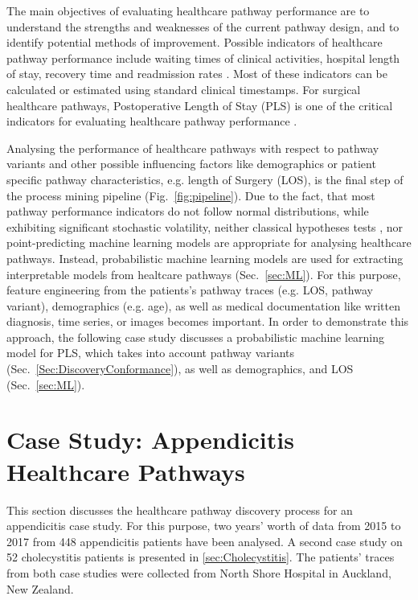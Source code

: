 The main objectives of evaluating healthcare pathway performance are
to understand the strengths and weaknesses of the current pathway design,
and to identify potential methods of improvement. Possible indicators
of healthcare pathway performance include waiting times of clinical
activities, hospital length of stay, recovery time and readmission
rates \cite{Rotter2008_pathways}.
Most of these indicators can be calculated or estimated using standard clinical timestamps.
For surgical healthcare pathways, Postoperative Length of Stay (PLS)
is one of the critical indicators for evaluating healthcare pathway
performance \cite{Pearson2001_pathways}.

Analysing the performance of healthcare pathways with respect to
pathway variants and other possible influencing factors like
demographics or patient specific pathway characteristics, e.g. length
of Surgery (LOS), is the final step of the process mining pipeline
(Fig.~\ref{fig:pipeline}).
Due to the fact, that most pathway performance indicators do not
follow normal distributions, while exhibiting significant stochastic
volatility, neither classical hypotheses tests \cite{Goodman2008_p-value}, nor point-predicting
machine learning models are appropriate for analysing healthcare
pathways.
Instead, probabilistic machine learning models
\cite{Ghahramani2015_PML} are used for extracting interpretable models
from healtcare pathways (Sec.~\ref{sec:ML}).
For this purpose, feature engineering \cite{DongLiu2018_FE} from
the patients's pathway traces (e.g. LOS, pathway variant),
demographics (e.g. age), as well as medical documentation like written
diagnosis, time series, or images becomes important.
In order to demonstrate this approach, the following case study
discusses a probabilistic machine learning model for PLS, which
takes into account pathway variants
(Sec.~\ref{Sec:DiscoveryConformance}), as well as demographics, and
LOS (Sec.~\ref{sec:ML}).

\section{Case Study: Appendicitis Healthcare Pathways}
This section discusses the healthcare pathway discovery process for an
appendicitis case study. For this purpose, two years’ worth of data
from 2015 to 2017 from 448 appendicitis patients have been analysed. 
A second case study on 52 cholecystitis patients is presented in \ref{sec:Cholecystitis}.
The patients' traces from both case studies were collected from North Shore Hospital in Auckland, New Zealand.

